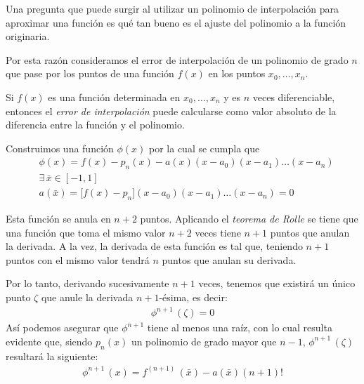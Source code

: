 \documentclass[12pt]{article}
\numberwithin{equation}{section}
\begin{document}
Una pregunta que puede surgir al utilizar un polinomio de interpolación para aproximar una función es qué tan bueno es el ajuste del polinomio a la función originaria.
\par
Por esta razón consideramos el error de interpolación de un polinomio de grado $n$ que pase por los puntos de una función $f(x)$ en los puntos $x_{0}, \ldots, x_{n}$.
\par
Si $f(x)$ es una función determinada en $x_{0}, \ldots, x_{n}$ y es $n$ veces diferenciable, entonces el \emph{error de interpolación} puede calcularse como valor absoluto de la diferencia entre la función y el polinomio.
\par
Construimos una función $\phi(x)$ por la cual se cumpla que
\begin{align*}
&\phi(x) = f(x) {-} p_{n}(x) {-} a(x)(x {-} a_{0})(x {-} a_{1}) \ldots (x {-} a_{n}) \\[0.5em]
&\exists \, \bar{x} \in [-1, 1] \\[0.5em]
&a(\bar{x}) = \big[ f(x) {-} p_{n} \big] (x {-} a_{0})(x {-} a_{1}) \ldots (x {-} a_{n}) = 0
\end{align*}

Esta función se anula en $n + 2$ puntos. Aplicando el \emph{teorema de Rolle} se tiene que una función que toma el mismo valor $n + 2$ veces tiene $n + 1$ puntos que anulan la derivada. A la vez, la derivada de esta función es tal que, teniendo $n + 1$ puntos con el mismo valor tendrá $n$ puntos que anulan su derivada. 
\par
Por lo tanto, derivando sucesivamente $n + 1$ veces, tenemos que existirá un único punto $\zeta$ que anule la derivada $n+1$-ésima, es decir:
\begin{align*}
\phi^{n+1} \, (\zeta) = 0
\end{align*}
Así podemos asegurar que $\phi^{n+1}$ tiene al menos una raíz, con lo cual resulta evidente que, siendo $p_{n}(x)$ un polinomio de grado mayor que $n - 1$, $\phi^{n+1} \, (\zeta)$ resultará la siguiente:
\begin{align*}
\phi^{n+1} \, (x) = f^{(n+1)} \, (\bar{x}) - a (\bar{x}) (n + 1)!
\end{align*}
\end{document}
